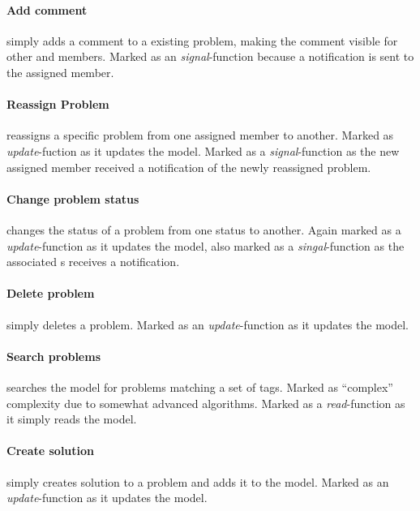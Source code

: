 \paragraph{Add comment} simply adds a comment to a existing problem, making the comment visible for other \client and \astaff[] members. Marked as an \textit{signal}-function because a notification is sent to the assigned \astaff[] member.  

\paragraph{Reassign Problem} reassigns a specific problem from one assigned \astaff[] member to another. Marked as \textit{update}-fuction as it updates the model. Marked as a \textit{signal}-function as the new assigned \astaff[] member received a notification of the newly reassigned problem. 

\paragraph{Change problem status} changes the status of a problem from one status to another. Again marked as a \textit{update}-function as it updates the model, also marked as a \textit{singal}-function as the associated \client s receives a notification. 

\paragraph{Delete problem} simply deletes a problem. Marked as an \textit{update}-function as it updates the model. 

\paragraph{Search problems} searches the model for problems matching a set of tags. Marked as ``complex'' complexity due to somewhat advanced algorithms. Marked as a \textit{read}-function as it simply reads the model.

\paragraph{Create solution} simply creates solution to a problem and adds it to the model. Marked as an \textit{update}-function as it updates the model. 

